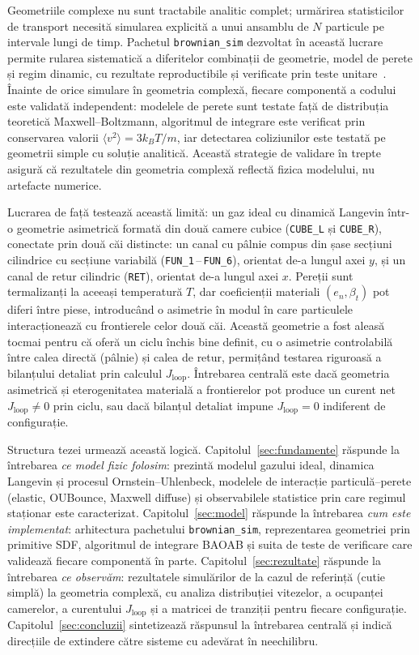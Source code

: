 \documentclass[12pt,openright,twoside]{book}
\begin{document}
Geometriile complexe nu sunt tractabile analitic complet; urmărirea statisticilor de transport necesită simularea explicită a unui ansamblu de $N$ particule pe intervale lungi de timp. Pachetul \texttt{brownian\_sim} dezvoltat în această lucrare permite rularea sistematică a diferitelor combinații de geometrie, model de perete și regim dinamic, cu rezultate reproductibile și verificate prin teste unitare~\cite{allen2017,frenkel2002}. Înainte de orice simulare în geometria complexă, fiecare componentă a codului este validată independent: modelele de perete sunt testate față de distribuția teoretică Maxwell--Boltzmann, algoritmul de integrare este verificat prin conservarea valorii $\langle v^2 \rangle = 3k_BT/m$, iar detectarea coliziunilor este testată pe geometrii simple cu soluție analitică. Această strategie de validare în trepte asigură că rezultatele din geometria complexă reflectă fizica modelului, nu artefacte numerice.

Lucrarea de față testează această limită: un gaz ideal cu dinamică Langevin într-o geometrie asimetrică formată din două camere cubice (\texttt{CUBE\_L} și \texttt{CUBE\_R}), conectate prin două căi distincte: un canal cu pâlnie compus din șase secțiuni cilindrice cu secțiune variabilă (\texttt{FUN\_1}\,--\,\texttt{FUN\_6}), orientat de-a lungul axei $y$, și un canal de retur cilindric (\texttt{RET}), orientat de-a lungul axei $x$. Pereții sunt termalizanți la aceeași temperatură $T$, dar coeficienții materiali $(e_n, \beta_t)$ pot diferi între piese, introducând o asimetrie în modul în care particulele interacționează cu frontierele celor două căi. Această geometrie a fost aleasă tocmai pentru că oferă un ciclu închis bine definit, cu o asimetrie controlabilă între calea directă (pâlnie) și calea de retur, permițând testarea riguroasă a bilanțului detaliat prin calculul $J_\text{loop}$. Întrebarea centrală este dacă geometria asimetrică și eterogenitatea materială a frontierelor pot produce un curent net $J_\text{loop} \neq 0$ prin ciclu, sau dacă bilanțul detaliat impune $J_\text{loop} = 0$ indiferent de configurație.

Structura tezei urmează această logică. Capitolul~\ref{sec:fundamente} răspunde la întrebarea \textit{ce model fizic folosim}: prezintă modelul gazului ideal, dinamica Langevin și procesul Ornstein--Uhlenbeck, modelele de interacție particulă--perete (elastic, OUBounce, Maxwell diffuse) și observabilele statistice prin care regimul staționar este caracterizat. Capitolul~\ref{sec:model} răspunde la întrebarea \textit{cum este implementat}: arhitectura pachetului \texttt{brownian\_sim}, reprezentarea geometriei prin primitive SDF, algoritmul de integrare BAOAB și suita de teste de verificare care validează fiecare componentă în parte. Capitolul~\ref{sec:rezultate} răspunde la întrebarea \textit{ce observăm}: rezultatele simulărilor de la cazul de referință (cutie simplă) la geometria complexă, cu analiza distribuției vitezelor, a ocupanței camerelor, a curentului $J_\text{loop}$ și a matricei de tranziții pentru fiecare configurație. Capitolul~\ref{sec:concluzii} sintetizează răspunsul la întrebarea centrală și indică direcțiile de extindere către sisteme cu adevărat în neechilibru.
\end{document}
